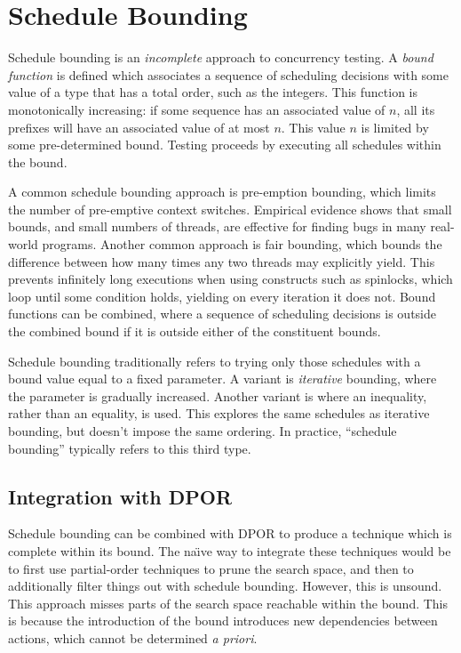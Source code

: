 \section{Schedule Bounding}
\label{sec:sct-bounding}

Schedule bounding\cite{emmi2011,musuvathi2008,musuvathi2007} is an
\emph{incomplete} approach to concurrency testing.  A \emph{bound function} is
defined which associates a sequence of scheduling decisions with some value of a
type that has a total order, such as the integers.  This function is
monotonically increasing: if some sequence has an associated value of $n$, all
its prefixes will have an associated value of at most $n$.  This value $n$ is
limited by some pre-determined bound.  Testing proceeds by executing all
schedules within the bound.

A common schedule bounding approach is pre-emption
bounding\cite{musuvathi2007}, which limits the number of pre-emptive
context switches.  Empirical evidence shows that small bounds, and
small numbers of threads, are effective for finding bugs in many
real-world programs\cite{thomson2014}.  Another common approach is
fair bounding\cite{musuvathi2008}, which bounds the difference between
how many times any two threads may explicitly yield.  This prevents
infinitely long executions when using constructs such as spinlocks,
which loop until some condition holds, yielding on every iteration it
does not.  Bound functions can be combined, where a sequence of
scheduling decisions is outside the combined bound if it is outside
either of the constituent bounds.

Schedule bounding traditionally refers to trying only those schedules
with a bound value equal to a fixed parameter.  A variant is
\emph{iterative} bounding, where the parameter is gradually
increased\cite{musuvathi2007}.  Another variant is where an
inequality, rather than an equality, is used.  This explores the same
schedules as iterative bounding, but doesn't impose the same ordering.
In practice, ``schedule bounding'' typically refers to this third
type.

\subsection{Integration with DPOR}

Schedule bounding can be combined with DPOR to produce a technique which is
complete within its bound.  The na\"{\i}ve way to integrate these techniques
would be to first use partial-order techniques to prune the search space, and
then to additionally filter things out with schedule bounding.  However, this is
unsound.  This approach misses parts of the search space reachable within the
bound.  This is because the introduction of the bound introduces new
dependencies between actions, which cannot be determined \emph{a
  priori}\cite{coons2013}.


